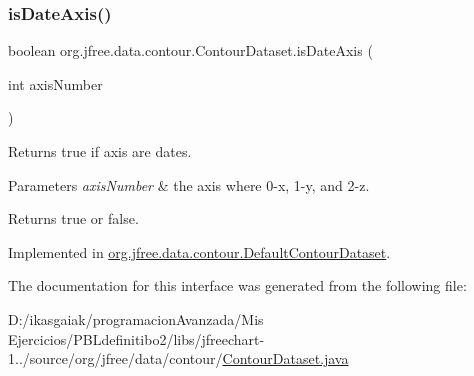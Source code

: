 \subsubsection{\texorpdfstring{is\+Date\+Axis()}{isDateAxis()}}
{\footnotesize\ttfamily boolean org.\+jfree.\+data.\+contour.\+Contour\+Dataset.\+is\+Date\+Axis (\begin{DoxyParamCaption}\item[{int}]{axis\+Number }\end{DoxyParamCaption})}

Returns true if axis are dates.


\begin{DoxyParams}{Parameters}
{\em axis\+Number} & the axis where 0-\/x, 1-\/y, and 2-\/z.\\
\hline
\end{DoxyParams}
\begin{DoxyReturn}{Returns}
{\ttfamily true} or {\ttfamily false}. 
\end{DoxyReturn}


Implemented in \mbox{\hyperlink{classorg_1_1jfree_1_1data_1_1contour_1_1_default_contour_dataset_ad9fe2cd6959003ca651206b20e19c70d}{org.\+jfree.\+data.\+contour.\+Default\+Contour\+Dataset}}.



The documentation for this interface was generated from the following file\+:\begin{DoxyCompactItemize}
\item 
D\+:/ikasgaiak/programacion\+Avanzada/\+Mis Ejercicios/\+P\+B\+Ldefinitibo2/libs/jfreechart-\/1../source/org/jfree/data/contour/\mbox{\hyperlink{_contour_dataset_8java}{Contour\+Dataset.\+java}}\end{DoxyCompactItemize}
